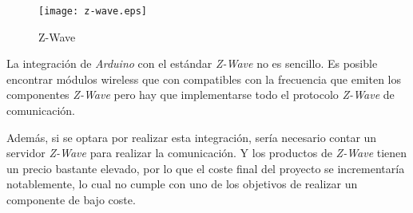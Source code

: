 \begin{figure}[H]
    \centering
    \texttt{[image: z-wave.eps]}
    \caption{Z-Wave}\label{fig:z-wave}
\end{figure}

La integración de \emph{Arduino} con el estándar \emph{Z-Wave} no es sencillo. Es posible encontrar módulos wireless que con compatibles con la frecuencia que emiten los componentes \emph{Z-Wave} pero hay que implementarse todo el protocolo \emph{Z-Wave} de comunicación.

Además, si se optara por realizar esta integración, sería necesario contar un servidor \emph{Z-Wave} para realizar la comunicación. Y los productos de \emph{Z-Wave} tienen un precio bastante elevado, por lo que el coste final del proyecto se incrementaría notablemente, lo cual no cumple con uno de los objetivos de realizar un componente de bajo coste.